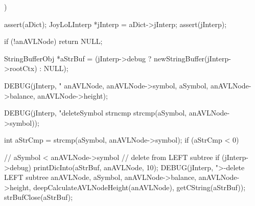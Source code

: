 ) {
  assert(aDict);
  JoyLoLInterp *jInterp = aDict->jInterp;
  assert(jInterp);
 
  if (!anAVLNode) return NULL;

  StringBufferObj *aStrBuf =
    (jInterp->debug ? newStringBuffer(jInterp->rootCtx) : NULL);

  DEBUG(jInterp, "\ndeleteSymbol %
        anAVLNode, anAVLNode->symbol, aSymbol,
        anAVLNode->balance, anAVLNode->height);

  DEBUG(jInterp, "deleteSymbol strncmp %
        strcmp(aSymbol, anAVLNode->symbol));

  int aStrCmp = strcmp(aSymbol, anAVLNode->symbol);
  if (aStrCmp < 0) {
    // aSymbol < anAVLNode->symbol // delete from LEFT subtree
    if (jInterp->debug) {
      printDicInto(aStrBuf, anAVLNode, 10);
      DEBUG(jInterp, ">-delete LEFT subtree %
            anAVLNode, aSymbol, anAVLNode->balance,
            anAVLNode->height, deepCalculateAVLNodeHeight(anAVLNode),
            getCString(aStrBuf));
      strBufClose(aStrBuf);
    }

}}
